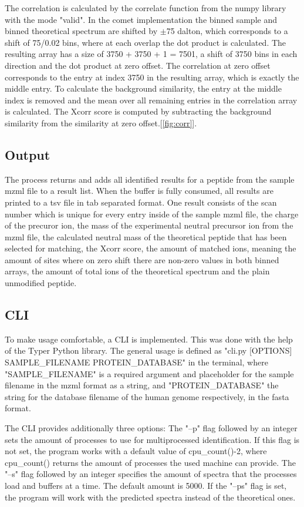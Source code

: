 \documentclass[11pt]{article}
\begin{document}
The correlation is calculated by the correlate function from the numpy library with the mode "valid". In the comet implementation the binned sample and binned theoretical spectrum are shifted by $\pm$75 dalton, which corresponds to a shift of 75/0.02 bins, where at each overlap the dot product is calculated. The resulting array has a size of 3750 + 3750 + 1 = 7501, a shift of 3750 bins in each direction and the dot product at zero offset. The correlation at zero offset corresponds to the entry at index 3750 in the resulting array, which is exactly the middle entry. To calculate the background similarity, the entry at the middle index is removed and the mean over all remaining entries in the correlation array is calculated. The Xcorr score is computed by subtracting the background similarity from the similarity at zero offset.[\cref{fig:corr}].


\subsection{Output}
The process returns and adds all identified results for a peptide from the sample mzml file to a result list. When the buffer is fully consumed, all results are printed to a tsv file in tab separated format. One result consists of the scan number which is unique for every entry inside of the sample mzml file, the charge of the precuror ion, the mass of the experimental neutral precursor ion from the mzml file, the calculated neutral mass of the theoretical peptide that has been selected for matching, the Xcorr score, the amount of matched ions, meaning the amount of sites where on zero shift there are non-zero values in both binned arrays, the amount of total ions of the theoretical spectrum and the plain unmodified peptide.


\subsection{CLI}
To make usage comfortable, a CLI is implemented. This was done with the help of the Typer Python library. The general usage is defined as "cli.py [OPTIONS] SAMPLE\_FILENAME PROTEIN\_DATABASE" in the terminal, where "SAMPLE\_FILENAME" is a required argument and placeholder for the sample filename in the mzml format as a string, and "PROTEIN\_DATABASE" the string for the database filename of the human genome respectively, in the fasta format. 

The CLI provides additionally three options: The "--p" flag followed by an integer sets the amount of processes to use for multiprocessed identification. If this flag is not set, the program works with a default value of cpu\_count()-2, where cpu\_count() returns the amount of processes the used machine can provide. The "--s" flag followed by an integer specifies the amount of spectra that the processes load and buffers at a time. The default amount is 5000. If the "--ps" flag is set, the program will work with the predicted spectra instead of the theoretical ones.
\end{document}
